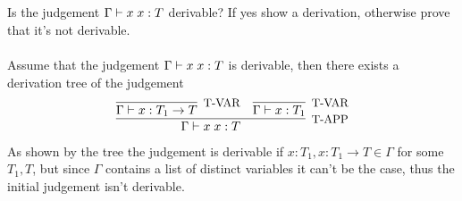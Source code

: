 \subsection{}

Is the judgement $\Gamma \vdash x\;x: T$ derivable? If yes show a
derivation, otherwise prove that it's not derivable.\\~\\
Assume that the judgement $\Gamma \vdash x\;x: T$ is derivable,
then there exists a derivation tree of the judgement
\begin{align*}
	\infer[\text{\small{T-APP}}]
	{\Gamma \vdash \APP{x}{x}: T}
	{
	\infer[\text{\small{T-VAR}}]{\Gamma \vdash x: T_1 \to T}{} &
		\infer[\text{\small{T-VAR}}]{\Gamma \vdash x: T_1}{}
	}
\end{align*}
As shown by the tree the judgement is derivable if
$x: T_1, x: T_1 \to T \in \Gamma$ for some $T_1, T$, but since $\Gamma$
contains a list of distinct variables it can't be the case, thus the
initial judgement isn't derivable.
